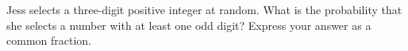 Jess selects a three-digit positive integer at random. What is the probability that she selects a number with at least one odd digit? Express your answer as a common fraction.
